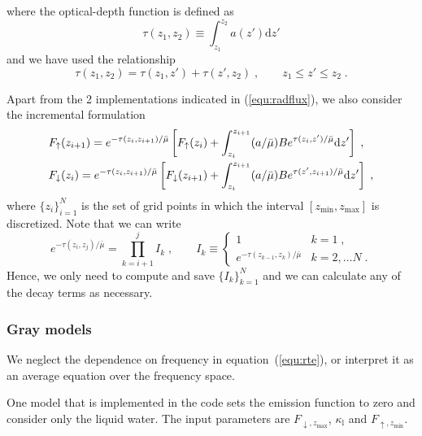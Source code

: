 where the optical-depth function is defined as
\begin{equation}
    \tau(z_1, z_2) \equiv \int_{z_1}^{z_2}a(z')\mathrm{d} z'
\end{equation}
and we have used the relationship
\begin{equation}
    \tau(z_1, z_2) = \tau(z_1, z') + \tau(z', z_2)\;,\qquad z_1\le z'\le z_2 \;.
\end{equation}

Apart from the 2 implementations indicated in (\ref{equ:radflux}), we also consider the incremental formulation
\begin{subequations}\label{equ:radflux}
    \begin{align}
        &F_\uparrow(z_{i+1}) = e^{-\tau(z_i,z_{i+1})/\bar{\mu}}\left[ F_\uparrow(z_i) + \int_{z_i}^{z_{i+1}} (a/\bar{\mu}) B e^{\tau(z_i,z')/\bar{\mu}}\mathrm{d}z'\right]\notag  \;,\\
        &F_\downarrow(z_i) = e^{-\tau(z_i,z_{i+1})/\bar{\mu}}\left[ F_\downarrow(z_{i+1}) + \int_{z_i}^{z_{i+1}} (a/\bar{\mu}) B e^{\tau(z',z_{i+1})/\bar{\mu}}\mathrm{d}z'\right]\notag  \;,\\
    \end{align}
\end{subequations}
where $\{z_i\}_{i=1}^N$ is the set of grid points in which the interval $[z_\mathrm{min}, z_\mathrm{max}]$ is discretized. Note that we can write
\begin{equation}
    e^{-\tau(z_i,z_j)/\bar{\mu}}=\prod_{k=i+1}^{j}I_k\;,\qquad 
    I_k\equiv\left\{
    \begin{array}{ll}
        1 & k=1\;,\\
        e^{-\tau(z_{k-1},z_k)/\bar{\mu}} & k=2,\ldots N \;.
    \end{array}
    \right.
\end{equation}
Hence, we only need to compute and save $\{I_k\}_{k=1}^N$ and we can calculate any of the decay terms as necessary.

\subsubsection{Gray models}

We neglect the dependence on frequency in equation~(\ref{equ:rte}), or interpret it as an average equation over the frequency space.

One model that is implemented in the code sets the emission function to zero and consider only the liquid water. The input parameters are $F_{\downarrow,z_\mathrm{max}}$, $\kappa_\mathrm{l}$ and $F_{\uparrow,z_\mathrm{min}}$.

